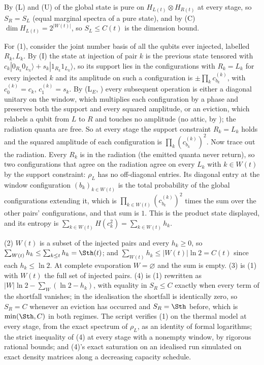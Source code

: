 By (L) and (U) of  the global state is pure on $H_{L(t)} \otimes H_{R(t)}$ at every stage, so $S_R = S_L$ (equal marginal spectra of a pure state), and by (C) $\dim H_{L(t)} = 2^{|W(t)|}$, so $S_L \leq C(t)$ is the dimension bound.

For (1), consider the joint number basis of all the qubits ever injected, labelled $R_k, L_k$. By (I) the state at injection of pair $k$ is the previous state tensored with $c_k|0_{R_k}0_{L_k}\rangle + s_k|1_{R_k}1_{L_k}\rangle$, so its support lies in the configurations with $R_k = L_k$ for every injected $k$ and its amplitude on such a configuration is $\pm\prod_k c^{(k)}_{b_k}$, with $c^{(k)}_0 = c_k$, $c^{(k)}_1 = s_k$. By (L$_E$, ) every subsequent operation is either a diagonal unitary on the window, which multiplies each configuration by a phase and preserves both the support and every squared amplitude, or an eviction, which relabels a qubit from $L$ to $R$ and touches no amplitude (no attic, by ); the radiation quanta are free. So at every stage the support constraint $R_k = L_k$ holds and the squared amplitude of each configuration is $\prod_k (c^{(k)}_{b_k})^{2}$. Now trace out the radiation. Every $R_k$ is in the radiation (the emitted quanta never return), so two configurations that agree on the radiation agree on every $L_k$ with $k \in W(t)$ by the support constraint: $\rho_L$ has no off-diagonal entries. Its diagonal entry at the window configuration $(b_k)_{k \in W(t)}$ is the total probability of the global configurations extending it, which is $\prod_{k \in W(t)}(c^{(k)}_{b_k})^{2}$ times the sum over the other pairs' configurations, and that sum is $1$. This is the product state displayed, and its entropy is $\sum_{k \in W(t)} H(c_k^{2}) = \sum_{k \in W(t)} h_k$.

(2) $W(t)$ is a subset of the injected pairs and every $h_k \geq 0$, so $\sum_{W(t)} h_k \leq \sum_{k \leq t} h_k = \Sth(t)$; and $\sum_{W(t)} h_k \leq |W(t)|\ln 2 = C(t)$ since each $h_k \leq \ln 2$. At complete evaporation $W = \varnothing$ and the sum is empty. (3) is (1) with $W(t)$ the full set of injected pairs. (4) is (1) rewritten as $|W|\ln 2 - \sum_{W}(\ln 2 - h_k)$, with equality in $S_R \leq C$ exactly when every term of the shortfall vanishes; in the idealisation the shortfall is identically zero, so $S_R = C$ whenever an eviction has occurred and $S_R = \Sth$ before, which is $\min(\Sth, C)$ in both regimes. The script verifies (1) on the thermal model at every stage, from the exact spectrum of $\rho_L$, as an identity of formal logarithms; the strict inequality of (4) at every stage with a nonempty window, by rigorous rational bounds; and (4)'s exact saturation on an idealised run simulated on exact density matrices along a decreasing capacity schedule.
